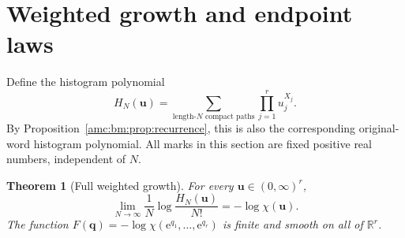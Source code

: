 \documentclass[11pt,letterpaper]{article}
\newtheorem{theorem}{Theorem}[section]
\theoremstyle{remark}\newtheorem{remark}[theorem]{Remark}
\newcommand{\ee}{\mathrm e}
\newcommand{\R}{\mathbb R}
\newcommand{\bu}{\boldsymbol u}
\begin{document}
\section{Weighted growth and endpoint laws}\label{amc:bm:sec:ratio}
Define the histogram polynomial
\[
 H_N(\bu)=\sum_{\text{length-}N\text{ compact paths}}\prod_{j=1}^r u_j^{X_j}.
\]
By Proposition~\ref{amc:bm:prop:recurrence}, this is also the corresponding original-word histogram polynomial. All marks in this section are fixed positive real numbers, independent of $N$.

\begin{theorem}[Full weighted growth]\label{amc:bm:thm:pressure}
For every $\bu\in(0,\infty)^r$,
\begin{equation}\label{amc:bm:eq:pressure}
 \lim_{N\to\infty}\frac1N\log\frac{H_N(\bu)}{N!}
 =-\log\chi(\bu).
\end{equation}
The function $F(\boldsymbol q)=-\log\chi(\ee^{q_1},\ldots,\ee^{q_r})$ is finite and smooth on all of $\R^r$.
\end{theorem}
\end{document}
